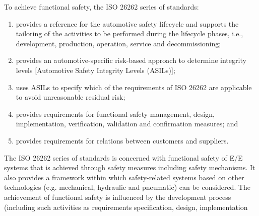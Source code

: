 \documentclass[./dissertation.tex]{subfiles}
\begin{document}
To achieve functional safety, the ISO 26262 series of standards:
\begin{enumerate}
\item provides a reference for the automotive safety lifecycle and supports the tailoring of the activities to be performed during the lifecycle phases, i.e., development, production, operation, service and decommissioning;
\item provides an automotive-specific risk-based approach to determine integrity levels [Automotive Safety Integrity Levels (ASILs)];
\item uses ASILs to specify which of the requirements of ISO 26262 are applicable to avoid unreasonable residual risk;
\item provides requirements for functional safety management, design, implementation, verification, validation and confirmation measures; and
\item provides requirements for relations between customers and suppliers.
\end{enumerate}

The ISO 26262 series of standards is concerned with functional safety of E/E systems that is achieved through safety measures including safety mechanisms. It also provides a framework within which safety-related systems based on other technologies (e.g. mechanical, hydraulic and pneumatic) can be considered. The achievement of functional safety is influenced by the development process (including such activities as requirements specification, design, implementation
\end{document}
